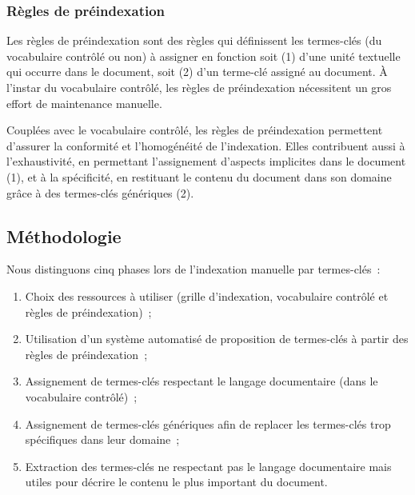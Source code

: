       \subsubsection{Règles de préindexation}
      \label{subsubsec:main-domain_specific_keyphrase_annotation-manual_keyphrase_annotation-resources-preindexing_rules}
        Les règles de préindexation sont des règles qui définissent les
        termes-clés (du vocabulaire contrôlé ou non) à assigner en fonction soit
        (1) d'une unité textuelle qui occurre dans le document, soit (2) d'un
        terme-clé assigné au document. À l'instar du vocabulaire contrôlé, les
        règles de préindexation nécessitent un gros effort de maintenance manuelle.
        
        Couplées avec le vocabulaire contrôlé, les règles de préindexation
        permettent d'assurer la conformité et l'homogénéité de l'indexation.
        Elles contribuent aussi à l'exhaustivité, en permettant l'assignement
        d'aspects implicites dans le document (1), et à la spécificité, en
        restituant le contenu du document dans son domaine grâce à des
        termes-clés génériques (2).

    \subsection{Méthodologie}
    \label{subsec:main-domain_specific_keyphrase_annotation-manual_keyphrase_annotation-methodology}
      Nous distinguons cinq phases lors de l'indexation manuelle par
      termes-clés~:
      \begin{enumerate}
        \item{Choix des ressources à utiliser (grille d'indexation, vocabulaire
              contrôlé et règles de préindexation)~;}
        \item{Utilisation d'un système automatisé de proposition de termes-clés
              à partir des règles de préindexation~;}
        \item{Assignement de termes-clés respectant le langage documentaire
              (dans le vocabulaire contrôlé)~;}
        \item{Assignement de termes-clés génériques afin de replacer les
              termes-clés trop spécifiques dans leur domaine~;}
        \item{Extraction des termes-clés ne respectant pas le langage
              documentaire mais utiles pour décrire le contenu le plus important
              du document.}
      \end{enumerate}

